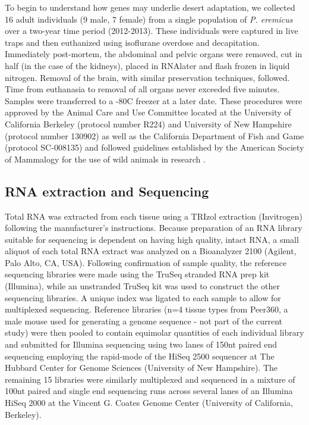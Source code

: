 \documentclass[12pt]{article}
\begin{document}
To begin to understand how genes may underlie desert adaptation, we collected 16 adult individuals (9 male, 7 female) from a single population of \textit{P. eremicus} over a two-year time period (2012-2013). These individuals were captured in live traps and then euthanized using isoflurane overdose and decapitation. Immediately post-mortem, the abdominal and pelvic organs were removed, cut in half (in the case of the kidneys), placed in RNAlater and flash frozen in liquid nitrogen. Removal of the brain, with similar preservation techniques, followed. Time from euthanasia to removal of all organs never exceeded five minutes. Samples were transferred to a -80C freezer at a later date. These procedures were approved by the Animal Care and Use Committee located at the University of California Berkeley (protocol number R224) and University of New Hampshire (protocol number 130902) as well as the California Department of Fish and Game (protocol SC-008135) and followed guidelines established by the American Society of Mammalogy for the use of wild animals in research \citep{Sikes:2011dz}.  

\subsection*{RNA extraction and Sequencing}

Total RNA was extracted from each tissue using a TRIzol extraction (Invitrogen) following the manufacturer's instructions. Because preparation of an RNA library suitable for sequencing is dependent on having high
quality, intact RNA, a small aliquot of each total RNA extract was
analyzed on a Bioanalyzer 2100 (Agilent, Palo Alto, CA, USA).
Following confirmation of sample quality, the reference sequencing libraries
were made using the TruSeq stranded RNA prep kit
(Illumina), while an unstranded TruSeq kit was used to construct the other sequencing libraries. A unique index was ligated to each sample to allow for multiplexed sequencing. Reference libraries (n=4 tissue types from Peer360, a male mouse used for generating a genome sequence - not part of the current study) were then pooled to contain equimolar quantities of each individual library and
submitted for Illumina sequencing using two lanes of 150nt paired end sequencing employing the rapid-mode of the HiSeq 2500 sequencer at The Hubbard Center for Genome Sciences (University of New Hampshire). The remaining 15 libraries were similarly multiplexed and sequenced in a mixture of 100nt paired and single end sequencing runs across several lanes of an Illumina HiSeq 2000 at the Vincent G. Coates Genome Center (University of California, Berkeley).
\end{document}
